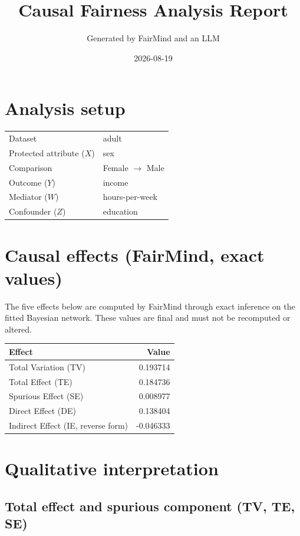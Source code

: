 \documentclass[11pt]{article}
\title{Causal Fairness Analysis Report}
\author{Generated by FairMind and an LLM}
\date{2026-08-19}
\begin{document}
\maketitle

\section{Analysis setup}

\begin{tabular}{ll}
\toprule
Dataset & adult \\
Protected attribute ($X$) & sex \\
Comparison & Female $\to$ Male \\
Outcome ($Y$) & income \\
Mediator ($W$) & hours-per-week \\
Confounder ($Z$) & education \\
\bottomrule
\end{tabular}

\section{Causal effects (FairMind, exact values)}

The five effects below are computed by FairMind through exact inference on the
fitted Bayesian network. These values are final and must not be recomputed or
altered.

\begin{tabular}{lr}
\toprule
Effect & Value \\
\midrule
Total Variation (TV) & 0.193714 \\
Total Effect (TE) & 0.184736 \\
Spurious Effect (SE) & 0.008977 \\
Direct Effect (DE) & 0.138404 \\
Indirect Effect (IE, reverse form) & -0.046333 \\
\bottomrule
\end{tabular}

\section{Qualitative interpretation}

\subsection{Total effect and spurious component (TV, TE, SE)}
\end{document}
